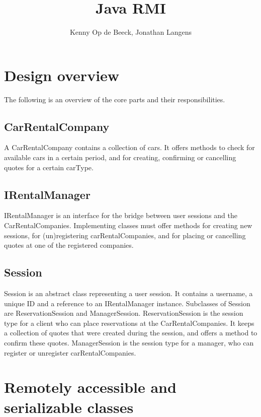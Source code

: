 \documentclass[a4paper,10pt]{article}
\author{Kenny Op de Beeck, Jonathan Langens}
\title{Java RMI}
\begin{document}
\maketitle

\section{Design overview}

The following is an overview of the core parts and their responsibilities.

\subsection{CarRentalCompany}

A CarRentalCompany contains a collection of cars. It offers methods to check for available cars in a certain period, and for creating, confirming or cancelling quotes for a certain carType.

\subsection{IRentalManager}

IRentalManager is an interface for the bridge between user sessions and the CarRentalCompanies. Implementing classes must offer methods for creating new sessions, for (un)registering carRentalCompanies, and for placing or cancelling quotes at one of the registered companies.

\subsection{Session}

Session is an abstract class representing a user session. It contains a username, a unique ID and a reference to an IRentalManager instance. Subclasses of Session are ReservationSession and ManagerSession. ReservationSession is the session type for a client who can place reservations at the CarRentalCompanies. It keeps a collection of quotes that were created during the session, and offers a method to confirm these quotes. ManagerSession is the session type for a manager, who can register or unregister carRentalCompanies.

\section{Remotely accessible and serializable classes}
\end{document}
